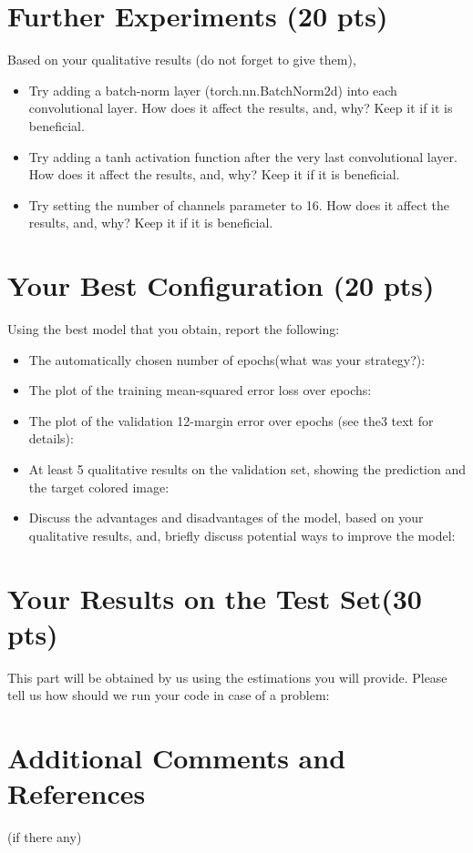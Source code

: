 \documentclass[12pt]{article}
\begin{document}
\section{Further Experiments (20 pts)}
    Based on your qualitative results (do not forget to give them),
    \begin{itemize}
        \item Try adding a batch-norm layer (torch.nn.BatchNorm2d) into each convolutional layer. How does it affect the results, and, why? Keep it if it is beneficial. 
        \item Try adding a tanh activation function after the very last convolutional layer. How does it affect the results, and, why? Keep it if it is beneficial. 
        
        \item Try setting the number of channels parameter to 16. How does it affect the results, and, why? Keep it if it is beneficial. 
        
      
    \end{itemize}


\section{Your Best Configuration (20 pts)}
Using the best model that you obtain, report the following:
 
    \begin{itemize}
        \item The automatically chosen number of epochs(what was your strategy?):
        \item The plot of the training mean-squared error loss over epochs:
        \item The  plot  of  the  validation  12-margin  error  over  epochs (see the3 text for details):
        \item At least 5 qualitative results on the validation set, showing the prediction and the target colored image:
        \item Discuss the advantages and disadvantages of the model, based on your qualitative results, and, briefly discuss potential ways to improve the model:
    \end{itemize}
    
\section{Your Results on the Test Set(30 pts)}
This part will be obtained by us using the estimations you will provide. Please tell us how should we run your code in case of a problem:

\section{Additional Comments and References}

    (if there any)
\end{document}
